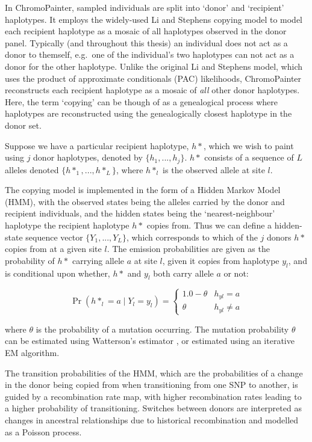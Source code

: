 In ChromoPainter, sampled individuals are split into `donor' and `recipient' haplotypes. It employs the widely-used Li and Stephens copying model \cite{Li2003} to model each recipient haplotype as a mosaic of all haplotypes observed in the donor panel. Typically (and throughout this thesis) an individual does not act as a donor to themself, e.g.\ one of the individual's two haplotypes can not act as a donor for the other haplotype. Unlike the original Li and Stephens model, which uses the product of approximate conditionals (PAC) likelihoods, ChromoPainter reconstructs each recipient haplotype as a mosaic of \textit{all} other donor haplotypes. Here, the term `copying' can be though of as a genealogical process where haplotypes are reconstructed using the genealogically closest haplotype in the donor set.  

Suppose we have a particular recipient haplotype, $h*$, which we wish to paint using $j$ donor haplotypes, denoted by $\{h_{1}, ..., h_{j}\}$. $h*$ consists of a sequence of $L$ alleles denoted $\{h*_{1}, ..., h*_{L}\}$, where $h*_{l}$ is the observed allele at site $l$.

The copying model is implemented in the form of a Hidden Markov Model (HMM), with the observed states being the alleles carried by the donor and recipient individuals, and the hidden states being the `nearest-neighbour' haplotype the recipient haplotype $h*$ copies from. Thus we can define a hidden-state sequence vector $\{Y_{1}, ..., Y_{L}\}$, which corresponds to which of the $j$ donors $h*$ copies from at a given site $l$. The emission probabilities are given as the probability of $h*$ carrying allele $a$ at site $l$, given it copies from haplotype $y_{l}$, and is conditional upon whether, $h*$ and $y_{l}$ both carry allele $a$ or not:

\begin{equation} \label{eq:cp}
\Pr(h*_{l} = a \mid Y_{l} = y_{l}) =     
	\begin{cases}
		1.0 - \theta & h_{yl} = a \\
		\theta & h_{yl} \neq a 
	\end{cases}       
\end{equation}

where $\theta$ is the probability of a mutation occurring. The mutation probability $\theta$ can be estimated using Watterson's estimator \cite{Watterson1975}, or estimated using an iterative EM algorithm.

The transition probabilities of the HMM, which are the probabilities of a change in the donor being copied from when transitioning from one SNP to another, is guided by a recombination rate map, with higher recombination rates leading to a higher probability of transitioning. Switches between donors are interpreted as changes in ancestral relationships due to historical recombination and modelled as a Poisson process. 

